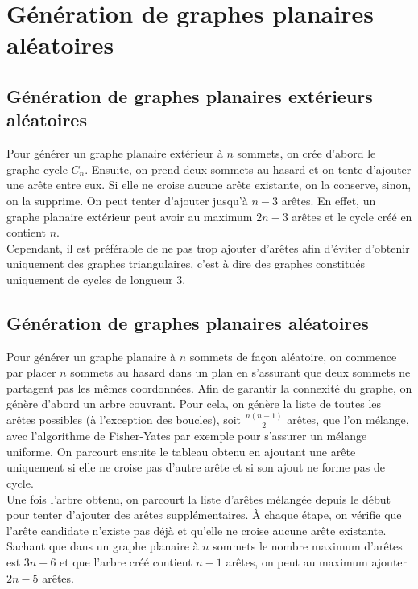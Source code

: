 \documentclass{article}
\begin{document}
\section{Génération de graphes planaires aléatoires}

\subsection{Génération de graphes planaires extérieurs aléatoires}

Pour générer un graphe planaire extérieur à $n$ sommets, on crée d'abord le graphe cycle $C_n$. Ensuite, on prend deux sommets au hasard et on tente d'ajouter une arête entre eux. Si elle ne croise aucune arête existante, on la conserve, sinon, on la supprime. On peut tenter d'ajouter jusqu'à $n-3$ arêtes. En effet, un graphe planaire extérieur peut avoir au maximum $2n-3$ arêtes et le cycle créé en contient $n$. \\
Cependant, il est préférable de ne pas trop ajouter d'arêtes afin d'éviter d'obtenir uniquement des graphes triangulaires, c'est à dire des graphes constitués uniquement de cycles de longueur 3.

\subsection{Génération de graphes planaires aléatoires}

Pour générer un graphe planaire à $n$ sommets de façon aléatoire, on commence par placer $n$ sommets au hasard dans un plan en s'assurant que deux sommets ne partagent pas les mêmes coordonnées. Afin de garantir la connexité du graphe, on génère d'abord un arbre couvrant. Pour cela, on génère la liste de toutes les arêtes possibles (à l'exception des boucles), soit $\frac{n(n-1)}{2}$ arêtes, que l'on mélange, avec l'algorithme de Fisher-Yates par exemple pour s'assurer un mélange uniforme. On parcourt ensuite le tableau obtenu en ajoutant une arête uniquement si elle ne croise pas d'autre arête et si son ajout ne forme pas de cycle.\\
Une fois l'arbre obtenu, on parcourt la liste d'arêtes mélangée depuis le début pour tenter d'ajouter des arêtes supplémentaires. À chaque étape, on vérifie que l'arête candidate n'existe pas déjà et qu'elle ne croise aucune arête existante. Sachant que dans un graphe planaire à $n$ sommets le nombre maximum d'arêtes est $3n-6$ et que l'arbre créé contient $n-1$ arêtes, on peut au maximum ajouter $2n-5$ arêtes.
\end{document}
